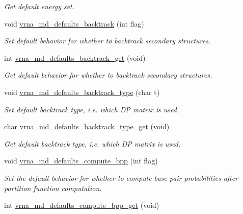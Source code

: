\begin{DoxyCompactItemize}
\begin{DoxyCompactList}\small\item\em Get default energy set. \end{DoxyCompactList}\item 
void \mbox{\hyperlink{group__model__details_ga978c468b2fe96a70d5191e3dd17d5599}{vrna\+\_\+md\+\_\+defaults\+\_\+backtrack}} (int flag)
\begin{DoxyCompactList}\small\item\em Set default behavior for whether to backtrack secondary structures. \end{DoxyCompactList}\item 
int \mbox{\hyperlink{group__model__details_ga90da1156e6883ddd68527c2830706648}{vrna\+\_\+md\+\_\+defaults\+\_\+backtrack\+\_\+get}} (void)
\begin{DoxyCompactList}\small\item\em Get default behavior for whether to backtrack secondary structures. \end{DoxyCompactList}\item 
void \mbox{\hyperlink{group__model__details_ga68305274de96b56b7799575e222560d8}{vrna\+\_\+md\+\_\+defaults\+\_\+backtrack\+\_\+type}} (char t)
\begin{DoxyCompactList}\small\item\em Set default backtrack type, i.\+e. which DP matrix is used. \end{DoxyCompactList}\item 
char \mbox{\hyperlink{group__model__details_ga1425b4ebd0e034dead66d79becd64143}{vrna\+\_\+md\+\_\+defaults\+\_\+backtrack\+\_\+type\+\_\+get}} (void)
\begin{DoxyCompactList}\small\item\em Get default backtrack type, i.\+e. which DP matrix is used. \end{DoxyCompactList}\item 
void \mbox{\hyperlink{group__model__details_gaf1b5db10f1f476767f9a95f8a78e3132}{vrna\+\_\+md\+\_\+defaults\+\_\+compute\+\_\+bpp}} (int flag)
\begin{DoxyCompactList}\small\item\em Set the default behavior for whether to compute base pair probabilities after partition function computation. \end{DoxyCompactList}\item 
int \mbox{\hyperlink{group__model__details_gaa3a537e61fbe0518673bf9f73fd820f3}{vrna\+\_\+md\+\_\+defaults\+\_\+compute\+\_\+bpp\+\_\+get}} (void)

\end{DoxyCompactItemize}
